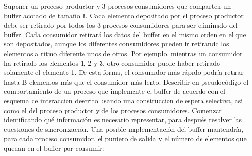 \begin{ejercicio}\label{ej:rel3_3}
    Suponer un proceso productor y 3 procesos consumidores que comparten un buffer acotado de tamaño \verb|B|. Cada elemento depositado por el proceso productor debe ser retirado por todos los 3 procesos consumidores para ser eliminado del buffer. Cada consumidor retirará los datos del buffer en el mismo orden en el que son depositados, aunque los diferentes consumidores pueden ir retirando los elementos a ritmo diferente unos de otros. Por ejemplo, mientras un consumidor ha retirado los elementos 1, 2 y 3, otro consumidor puede haber retirado solamente el elemento 1. De esta forma, el consumidor más rápido podría retirar hasta B elementos más que el consumidor más lento. Describir en pseudocódigo el comportamiento de un proceso que implemente el buffer de acuerdo con el esquema de interacción descrito usando una construcción de espera selectiva, así como el del proceso productor y de los procesos consumidores. Comenzar identificando qué información es necesario representar, para después resolver las cuestiones de sincronización.
    Una posible implementación del buffer mantendría, para cada proceso consumidor, el puntero de salida y el número de elementos que quedan en el buffer por consumir:

    \begin{figure}[H]
        \centering
\end{figure}
\end{ejercicio}
